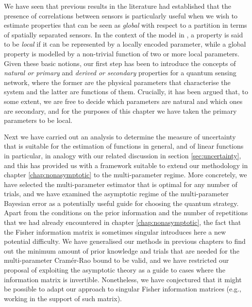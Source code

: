 We have seen that previous results in the literature had established that the presence of correlations between sensors is particularly useful when we wish to estimate properties that can be seen as \emph{global} with respect to a partition in terms of spatially separated sensors. In the context of the model in \cite{proctor2017networked, proctor2017networkedshort}, a property is said to be \emph{local} if it can be represented by a locally encoded parameter, while a global property is modelled by a non-trivial function of two or more local parameters. Given these basic notions, our first step has been to introduce the concepts of \emph{natural or primary} and \emph{derived or secondary} properties for a quantum sensing network, where the former are the physical parameters that characterise the system and the latter are functions of them. Crucially, it has been argued that, to some extent, we are free to decide which parameters are natural and which ones are secondary, and for the purposes of this chapter we have taken the primary parameters to be local. 

Next we have carried out an analysis to determine the measure of uncertainty that is suitable for the estimation of functions in general, and of linear functions in particular, in analogy with our related discussion in section \ref{sec:uncertainty}, and this has provided us with a framework suitable to extend our methodology in chapter \ref{chap:nonasymptotic} to the multi-parameter regime. More concretely, we have selected the multi-parameter estimator that is optimal for any number of trials, and we have examined the asymptotic regime of the multi-parameter Bayesian error as a potentially useful guide for choosing the quantum strategy. Apart from the conditions on the prior information and the number of repetitions that we had already encountered in chapter \ref{chap:nonasymptotic}, the fact that the Fisher information matrix is sometimes singular introduces here a new potential difficulty. We have generalised our methods in previous chapters to find out the minimum amount of prior knowledge and trials that are needed for the multi-parameter Cram\'{e}r-Rao bound to be valid, and we have restricted our proposal of exploiting the asymptotic theory as a guide to cases where the information matrix is invertible.  Nonetheless, we have conjectured that it might be possible to adapt our approach to singular Fisher information matrices (e.g., working in the support of such matrix). 

